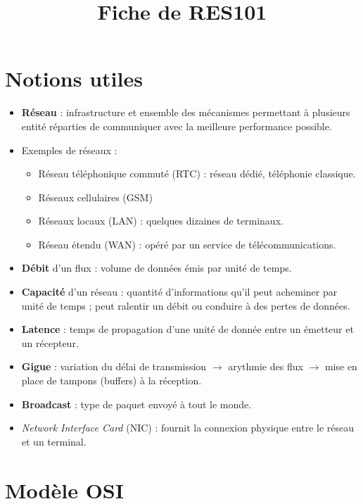 \documentclass[a4paper,9pt, twocolumn]{article}
\title{\vspace{-1.1cm} \textbf{Fiche de RES101} \vspace{-1.1cm}}
\date{}
\author{}
\newcommand\rar{\rightarrow}
\begin{document}
\maketitle

\section*{Notions utiles}

	\begin{itemize}
		\item[\textbullet] \textbf{Réseau} : infrastructure et ensemble des mécanismes permettant à plusieurs entité réparties de communiquer avec la meilleure performance possible.
		\item[\textbullet] Exemples de réseaux :
			\begin{itemize}
			\item Réseau téléphonique commuté (RTC) : réseau dédié, téléphonie classique.
			\item Réseaux cellulaires (GSM)
			\item Réseaux locaux (LAN) : quelques dizaines de terminaux.
			\item Réseau étendu (WAN) : opéré par un service de télécommunications.
			\end{itemize}
		\item[\textbullet] \textbf{Débit} d'un flux : volume de données émis par unité de temps.
		\item[\textbullet] \textbf{Capacité} d'un réseau : quantité d'informations qu'il peut acheminer par unité de temps ; peut ralentir un débit ou conduire à des pertes de données.
		\item[\textbullet] \textbf{Latence} : temps de propagation d'une unité de donnée entre un émetteur et un récepteur.
		\item[\textbullet] \textbf{Gigue} : variation du délai de transmission $\rar$ arythmie des flux $\rar$ mise en place de tampons (buffers) à la réception.
		\item[\textbullet] \textbf{Broadcast} : type de paquet envoyé à tout le monde.
		\item[\textbullet] \emph{Network Interface Card} (NIC) : fournit la connexion physique entre le réseau et un terminal.
	\end{itemize}

\section*{Modèle OSI}
\end{document}
